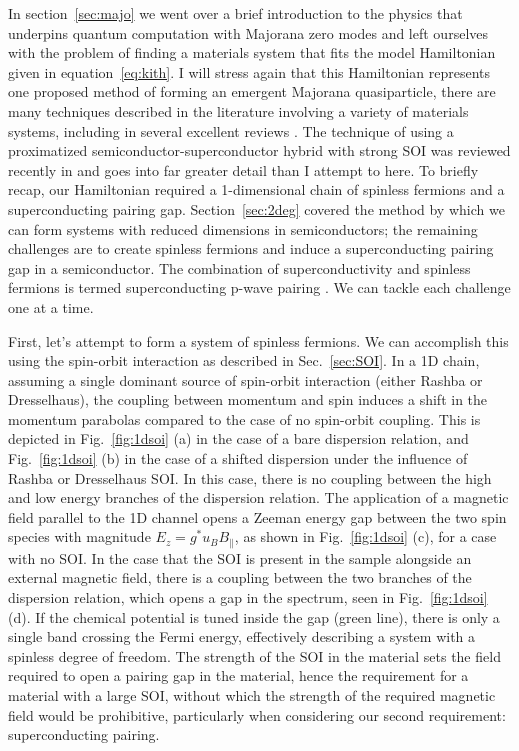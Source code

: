 In section~\ref{sec:majo} we went over a brief introduction to the physics that underpins quantum computation with Majorana zero modes
and left ourselves with the problem of finding a materials system that fits the model Hamiltonian given in equation~\ref{eq:kith}. I will stress
again that this Hamiltonian represents one proposed method of forming an emergent Majorana quasiparticle, there are many techniques described
in the literature involving a variety of materials systems, including in several excellent reviews \cite{RevModPhys.83.1057,doi:10.1146/030212-184337,Leijnse_2012,
RevModPhys.87.137,npjqi.2015.1,Aguado:2017ofc}. The technique of using a proximatized semiconductor-superconductor hybrid with strong SOI was reviewed
recently in \cite{s41578-018-0003-1} and goes into far greater detail than I attempt to here. To briefly recap, our Hamiltonian required a 1-dimensional
chain of spinless fermions and a superconducting pairing gap. Section~\ref{sec:2deg} covered the method by which we
can form systems with reduced dimensions in semiconductors; the remaining challenges are to create spinless fermions and induce a superconducting pairing gap
in a semiconductor. The combination of superconductivity and spinless fermions is termed superconducting p-wave pairing \cite{Kitaev_2001}. We can tackle
each challenge one at a time.

First, let's attempt to form a system of spinless fermions. We can accomplish this using the spin-orbit interaction as described in
Sec.~\ref{sec:SOI}. In a 1D chain, assuming a single dominant source of spin-orbit interaction (either Rashba or Dresselhaus), the coupling between momentum
and spin induces a shift in the momentum parabolas compared to the case of no spin-orbit coupling. This is depicted in Fig.~\ref{fig:1dsoi} (a) in the case of a bare
dispersion relation, and Fig.~\ref{fig:1dsoi} (b) in the case of a shifted dispersion under the influence of Rashba or Dresselhaus SOI. In this case, there is
no coupling between the high and low energy branches of the dispersion relation. The application of a magnetic field parallel to the 1D channel opens a Zeeman energy
gap between the two spin species with magnitude $E_z = g^* u_B B_\parallel$, as shown in Fig.~\ref{fig:1dsoi} (c), for a case with no SOI. In the case that the
SOI is present in the sample alongside an external magnetic field, there is a coupling between the two branches of the dispersion relation, which opens a gap in the
spectrum, seen in Fig.~\ref{fig:1dsoi} (d). If the chemical
potential is tuned inside the gap (green line), there is only a single band crossing the Fermi energy, effectively describing a system with a spinless degree of freedom.
The strength of the SOI in the material sets the field required to open a pairing gap in the material, hence the requirement for a material with a large SOI, without
which the strength of the required magnetic field would be prohibitive, particularly when considering our second requirement: superconducting pairing.

